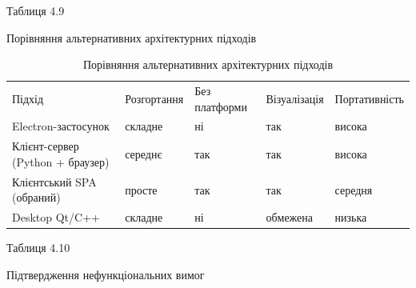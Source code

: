 \documentclass[
]{article}
\begin{document}
Таблиця 4.9

Порівняння альтернативних архітектурних підходів

\begin{longtable}[]{@{}
  >{\raggedright\arraybackslash}p{}
  >{\raggedright\arraybackslash}p{}
  >{\raggedright\arraybackslash}p{}
  >{\raggedright\arraybackslash}p{}
  >{\raggedright\arraybackslash}p{}@{}}
\caption[Порівняння альтернативних архітектурних підходів]{Порівняння
альтернативних архітектурних підходів}\tabularnewline
\toprule\noalign{}
\endfirsthead
\endhead
\bottomrule\noalign{}
\endlastfoot
Підхід & Розгортання & Без платформи & Візуалізація & Портативність \\
Electron-застосунок & складне & ні & так & висока \\
Клієнт-сервер (Python + браузер) & середнє & так & так & висока \\
Клієнтський SPA (обраний) & просте & так & так & середня \\
Desktop Qt/C++ & складне & ні & обмежена & низька \\
\end{longtable}

Таблиця 4.10

Підтвердження нефункціональних вимог
\end{document}
